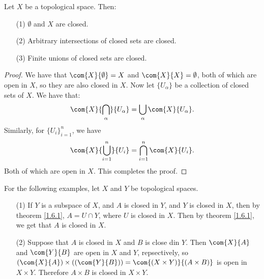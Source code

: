 \begin{theorem}\label{1.6.1}
    Let $X$ be a topological space. Then:
         \begin{enumerate}
             \item[(1)] $\emptyset$ and  $X$ are closed.

             \item[(2)] Arbitrary intersections of closed sets are closed.

             \item[(3)] Finite unions of closed sets are closed.
        \end{enumerate}
\end{theorem}
\begin{proof}
    We have that $\com{X}{\emptyset}=X$ and  $\com{X}{X}=\emptyset$, both of
    which are open in  $X$, so they are also closed in  $X$. Now let
    $\{U_{\alpha}\}$ be a collection of closed sets of  $X$. We have that:
        \begin{equation*}
            \com{X}{\bigcap_{\alpha}}{U_{\alpha}}=\bigcup_{\alpha}{\com{X}{U_{\alpha}}}.
        \end{equation*}
        Similarly, for $\{U_i\}_{i=1}^{n}$, we have
        \begin{equation*}
            \com{X}{\bigcup_{i=1}^{n}}{U_{i}}=\bigcap_{i=1}^{n}{\com{X}{U_{i}}}.
        \end{equation*}
    Both of which are open in $X$. This completes the proof.
\end{proof}

\begin{example}\label{1.12}
    For the following examples, let $X$ and  $Y$ be topological spaces.
    \begin{enumerate}
        \item[(1)] If $Y$ is a subspace of  $X$, and  $A$ is closed in  $Y$, and
             $Y$ is closed in  $X$, then by theorem \ref {1.6.1}, $A=U \cap Y$,
             where  $U$ is closed in  $X$. Then by theorem \ref {1.6.1}, we get
             that $A$ is closed in  $X$.

         \item [(2)] Suppose that $A$ is closed in  $X$ and  $B$ is close din
             $Y$. Then  $\com{X}{A}$ and $\com{Y}{B}$ are open in $X$ and $Y$,
             repsectively, so $(\com{X}{A}) \times ((\com{Y}{B}))=\com{(X \times
             Y)}{(A \times B)}$ is open in $X \times Y$. Therefore  $A \times B$
             is closed in  $X \times Y$.
    \end{enumerate}
\end{example}

